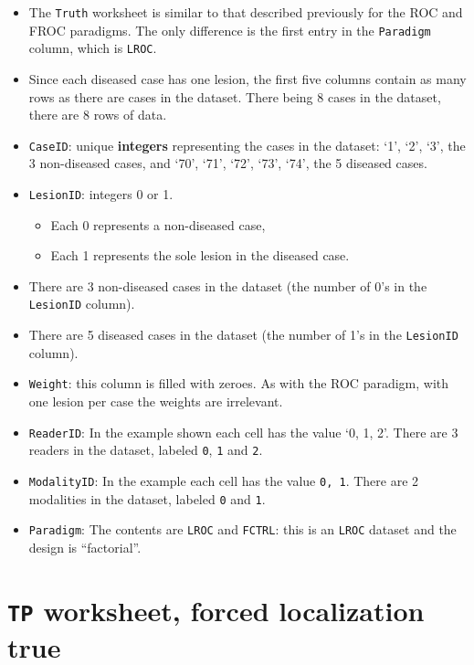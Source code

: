 \documentclass[
]{book}
\providecommand{\tightlist}{%
  \setlength{\itemsep}{0pt}\setlength{\parskip}{0pt}}
\begin{document}
\begin{itemize}
\tightlist
\item
  The \texttt{Truth} worksheet is similar to that described previously for the ROC and FROC paradigms. The only difference is the first entry in the \texttt{Paradigm} column, which is \texttt{LROC}.
\item
  Since each diseased case has one lesion, the first five columns contain as many rows as there are cases in the dataset. There being 8 cases in the dataset, there are 8 rows of data.
\item
  \texttt{CaseID}: unique \textbf{integers} representing the cases in the dataset: `1', `2', `3', the 3 non-diseased cases, and `70', `71', `72', `73', `74', the 5 diseased cases.\\
\item
  \texttt{LesionID}: integers 0 or 1.

  \begin{itemize}
  \tightlist
  \item
    Each 0 represents a non-diseased case,
  \item
    Each 1 represents the sole lesion in the diseased case.
  \end{itemize}
\item
  There are 3 non-diseased cases in the dataset (the number of 0's in the \texttt{LesionID} column).
\item
  There are 5 diseased cases in the dataset (the number of 1's in the \texttt{LesionID} column).
\item
  \texttt{Weight}: this column is filled with zeroes. As with the ROC paradigm, with one lesion per case the weights are irrelevant.
\item
  \texttt{ReaderID}: In the example shown each cell has the value `0, 1, 2'. There are 3 readers in the dataset, labeled \texttt{0}, \texttt{1} and \texttt{2}.
\item
  \texttt{ModalityID}: In the example each cell has the value \texttt{0,\ 1}. There are 2 modalities in the dataset, labeled \texttt{0} and \texttt{1}.
\item
  \texttt{Paradigm}: The contents are \texttt{LROC} and \texttt{FCTRL}: this is an \texttt{LROC} dataset and the design is ``factorial''.
\end{itemize}

\hypertarget{quick-start-lroc-tp1}{%
\section{\texorpdfstring{\texttt{TP} worksheet, forced localization true}{TP worksheet, forced localization true}}\label{quick-start-lroc-tp1}}
\end{document}
